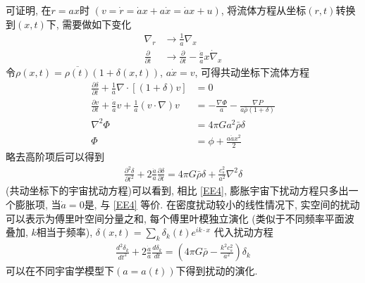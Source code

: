 可证明, 在$r=ax$时 $(v=\dot{r}=\dot{a}x+a\dot{x}=\dot{a}x+u)$, 将流体方程从坐标$(r,t)$转换到$(x, t)$下, 需要做如下变化
\begin{align*}
    \nabla_r&\rightarrow \frac{1}{a}\nabla_x\\
    \frac{\partial }{\partial t}&\rightarrow \frac{\partial }{\partial t}-\frac{\dot{a}}{a}x\dot\nabla_x
\end{align*}
令$\rho(x,t)=\overline{\rho(t)}(1+\delta(x,t))$, $a\dot{x}=v$, 可得共动坐标下流体方程
\begin{align*}
    \frac{\partial \delta}{\partial t}+\frac{1}{a}\nabla\cdot[(1+\delta)v]&=0\\
    \frac{\partial v}{\partial t}+\frac{\dot{a}}{a}v+\frac{1}{a}(v\cdot \nabla)v&=-\frac{\nabla\Phi}{a}-\frac{\nabla P}{a\bar{\rho}(1+\delta)}\\
    \nabla^2\Phi&=4\pi Ga^2\bar{\rho} \delta\\
    \Phi&=\phi+\frac{a\ddot{a}x^2}{2}
\end{align*}
略去高阶项后可以得到
\begin{align}
    \frac{\partial^2 \delta}{\partial t^2}+2\frac{\dot{a}}{a}\frac{\partial \delta}{\partial t}=4\pi G \bar{\rho}\delta+\frac{c_s^2}{a^2}\nabla^2 \delta \label{EE5}
\end{align}
(共动坐标下的宇宙扰动方程)可以看到, 相比 \ref{EE4}, 膨胀宇宙下扰动方程只多出一个膨胀项, 当$\dot{a}=0$是, 与 \ref{EE4} 等价. 
在密度扰动较小的线性情况下, 实空间的扰动可以表示为傅里叶空间分量之和, 每个傅里叶模独立演化 (类似于不同频率平面波叠加, $k$相当于频率), $\displaystyle \delta(x,t)=\sum_k\delta_k(t)e^{ik\cdot x}$ 代入扰动方程
\begin{align}
    \frac{d^2\delta_k}{d t^2}+2\frac{\dot{a}}{a}\frac{d\delta_k}{dt}=\left( 4\pi G \bar\rho-\frac{k^2c_s^2}{a^2} \right)\delta_k \label{EE6}
\end{align}
可以在不同宇宙学模型下$(a=a(t))$下得到扰动的演化. 
